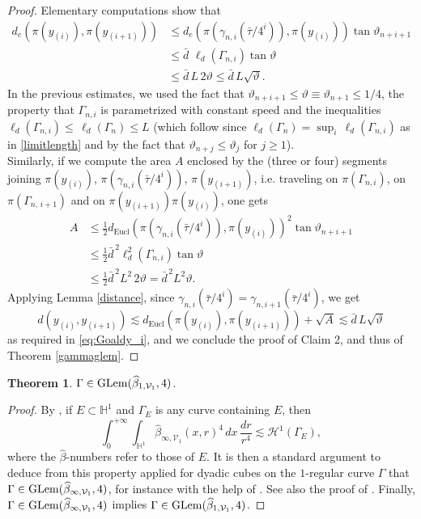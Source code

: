 \documentclass[12pt]{amsart}
\renewcommand{\H}{\mathbb H}
\renewcommand{\theta}{\vartheta}
\numberwithin{equation}{section}
\theoremstyle{plain}
\newtheorem{theorem}{Theorem}[section]
\theoremstyle{definition}
\theoremstyle{remark}
\begin{document}
\begin{proof}
\noindent Elementary computations show that 
\[\begin{split}d_e(\pi(y_{(i)}),\pi(y_{(i+1)}))&\leq  d_e\left(\pi\left(\gamma_{n,i}\left(\bar \tau/{4^i}\right)\right), \pi(y_{(i)})\right)\tan \theta_{n+i+1}\\&\leq \bar d\,\,\ell_d (\Gamma_{n,i})\tan \theta\\ & \leq \bar d\,L \,2\theta\leq \bar d\,L\sqrt\theta.\end{split}\]
In the previous estimates, we used the fact that $\theta_{n+i+1}\leq \theta\equiv\theta_{n+1} \leq 1/4$, the property that $\Gamma_{n,i}$ is parametrized with constant speed and the inequalities $\ell_d(\Gamma_{n,i})\leq\,\ell_d(\Gamma_n)\leq L$ (which follow since $\ell_d(\Gamma_n)=\sup_i\, \ell_d(\Gamma_{n,i})$ as in \eqref{limitlength} and by the fact that $\theta_{n+j}\leq \theta_j$ for $j\geq 1$).\medskip\\
Similarly, if we compute the area $A$ enclosed by the (three or four) segments joining $\pi(y_{(i)})$, $\pi(\gamma_{n,i}(\bar\tau/4^i))$, $\pi(y_{(i+1)})$, i.e. traveling on $\pi(\Gamma_{n,i})$, on $\pi(\Gamma_{n,\,i+1})$ and on $\pi(y_{(i+1)})\pi(y_{(i)}) $, one gets
\[\begin{split}A&\leq \frac{1}{2}d_{\mathrm{Eucl}}\left(\pi\left(\gamma_{n,i}\left(\bar \tau/{4^i}\right)\right), \pi(y_{(i)})\right)^2\tan \theta_{n+i+1}\\&\leq\frac{1}{2}\bar d^{\,2}\ell^2_d (\Gamma_{n,i})\tan\theta\\ &\leq \frac{1}{2}\bar d^{\,2}L^2\,2\theta=\bar d^{\,2}L^2\theta.\end{split}\]
Applying Lemma \ref{distance}, since $\gamma_{n,i}(\bar\tau/4^i)=\gamma_{n,i+1}(\bar\tau/4^i)$, we get 
\[d(y_{(i)}, y_{(i+1)})\lesssim d_{\mathrm{Eucl}}(\pi(y_{(i)}),\pi(y_{(i+1)}))+\sqrt A\lesssim \bar d\, L\sqrt\theta\]
as required in \eqref{eq:Goaldy_i}, 
and we conclude the proof of Claim 2, and thus of Theorem \ref{gammaglem}.
\end{proof}


\begin{theorem}\label{t:JuilletCurveGLem}
    $\Gamma\in{\rm GLem}(\widehat\beta_{1,\mathcal V_1},4)$.
\end{theorem}
\begin{proof}
    By \cite[Theorem 1.5]{Li}, if $E\subset \mathbb{H}^1$ and $\Gamma_E$ is any curve containing $E$, then 
    \begin{equation*}\label{gammatraveling}\int_0^{+\infty}\int_{\H^1}\widehat\beta_{\infty,\mathcal V_1}(x,r)^4\,dx\,\frac{dr}{r^4}\lesssim \mathcal H^1(\Gamma_E),\end{equation*}
where the $\widehat{\beta}$-numbers refer to those of $E$.
It is then a standard argument to deduce from this property applied for dyadic cubes %
on the $1$-regular curve $\Gamma$ that  $\Gamma\in{\rm GLem}(\widehat\beta_{\infty,\mathcal V_1},4)$, for instance with the help of \cite[Corollary 3.2]{FV1}. See also
  the proof of \cite[Proposition 3.1]{chouli}. Finally, 
 $\Gamma\in{\rm GLem}(\widehat\beta_{\infty,\mathcal V_1},4)$ implies $\Gamma\in{\rm GLem}(\widehat\beta_{1,\mathcal V_1},4)$.
\end{proof}
\end{document}
